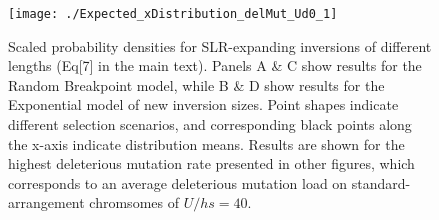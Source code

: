 \documentclass{article}
\begin{document}
\begin{appendices}
\newpage
 \begin{figure}[H]
 \centering
 \texttt{[image: ./Expected\_xDistribution\_delMut\_Ud0\_1]}
 \caption{Scaled probability densities for SLR-expanding inversions of different lengths (Eq[7] in the main text). Panels A \& C show results for the Random Breakpoint model, while B \& D show results for the Exponential model of new inversion sizes. Point shapes indicate different selection scenarios, and corresponding black points along the x-axis indicate distribution means. Results are shown for the highest deleterious mutation rate presented in other figures, which corresponds to an average deleterious mutation load on standard-arrangement chromsomes of $U/hs = 40$.}
 \label{fig:ExpectedDistFig_Ud0_1}
 \end{figure}




\newpage



\end{appendices}
\end{document}
